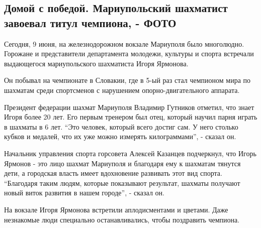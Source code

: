  
 
 
 
 
 
\subsection{Домой с победой. Мариупольский шахматист завоевал титул чемпиона, - ФОТО}
\label{sec:09_07_2019.stz.news.ua.mrpl.0629.1.domoj_s_pobedoj_jarmonov_chess}
 


Сегодня, 9 июня, на железнодорожном вокзале Мариуполя было многолюдно. Горожане
и представители департамента молодежи, культуры и спорта встречали выдающегося
мариупольского шахматиста  Игоря Ярмонова.

Он побывал на чемпионате в Словакии, где в 5-ый раз стал чемпионом мира по
шахматам среди спортсменов с нарушением опорно-двигательного аппарата.

Президент федерации шахмат Мариуполя Владимир Гутников отметил, что знает Игоря
более 20 лет. Его первым тренером был отец, который научил парня играть в
шахматы в 6 лет.  \enquote{Это человек, который всего достиг сам. У него столько кубков
и медалей, что их уже можно измерять килограммами}, - сказал он.

Начальник управления спорта горсовета Алексей Казанцев подчеркнул, что Игорь
Ярмонов - это лицо шахмат Мариуполя и благодаря ему к шахматам тянутся дети, а
городская власть имеет вдохновение развивать этот вид спорта. \enquote{Благодаря таким
людям, которые показывают результат, шахматы получают новый виток развития в
нашем городе}, - сказал он.

На вокзале Игоря Ярмонова встретили аплодисментами и цветами. Даже незнакомые
люди специально останавливались, чтобы поздравить чемпиона.

